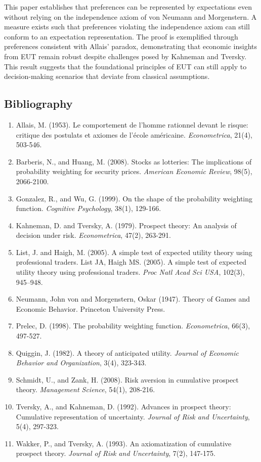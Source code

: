 \documentclass{article}
\begin{document}
This paper establishes that preferences can be represented by expectations even without relying on the independence axiom of von Neumann and Morgenstern. A measure exists such that preferences violating the independence axiom can still conform to an expectation representation. The proof is exemplified through preferences consistent with Allais' paradox, demonstrating that economic insights from EUT remain robust despite challenges posed by Kahneman and Tversky. This result suggests that the foundational principles of EUT can still apply to decision-making scenarios that deviate from classical assumptions.
\newpage
\subsection*{Bibliography}
\begin{enumerate}
    \item Allais, M. (1953). Le comportement de l'homme rationnel devant le risque: critique des postulats et axiomes de l'école américaine. \textit{Econometrica}, 21(4), 503-546.
    \item Barberis, N., and Huang, M. (2008). Stocks as lotteries: The implications of probability weighting for security prices. \textit{American Economic Review}, 98(5), 2066-2100.
    \item Gonzalez, R., and Wu, G. (1999). On the shape of the probability weighting function. \textit{Cognitive Psychology}, 38(1), 129-166.
    \item Kahneman, D. and Tversky, A. (1979). Prospect theory: An analysis of decision under risk. \textit{Econometrica}, 47(2), 263-291.
    \item List, J. and Haigh, M. (2005).  A simple test of expected utility theory using professional traders.  List JA, Haigh MS. (2005). A simple test of expected utility theory using professional traders. \textit{Proc Natl Acad Sci USA}, 102(3), 945–948.
    \item Neumann, John von and Morgenstern, Oskar (1947). Theory of Games and Economic Behavior. Princeton University Press.
    \item Prelec, D. (1998). The probability weighting function. \textit{Econometrica}, 66(3), 497-527.
    \item Quiggin, J. (1982). A theory of anticipated utility. \textit{Journal of Economic Behavior and Organization}, 3(4), 323-343.
    \item Schmidt, U., and Zank, H. (2008). Risk aversion in cumulative prospect theory. \textit{Management Science}, 54(1), 208-216.
    \item Tversky, A., and Kahneman, D. (1992). Advances in prospect theory: Cumulative representation of uncertainty. \textit{Journal of Risk and Uncertainty}, 5(4), 297-323.
    \item Wakker, P., and Tversky, A. (1993). An axiomatization of cumulative prospect theory. \textit{Journal of Risk and Uncertainty}, 7(2), 147-175.
    
\end{enumerate}
	
\end{document}
